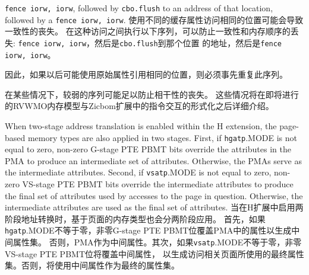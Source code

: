 {\tt fence iorw, iorw}, followed by {\tt cbo.flush} to an address of
that location, followed by a {\tt fence iorw, iorw}.
使用不同的缓存属性访问相同的位置可能会导致一致性的丧失。
在这种访问之间执行以下序列，可以防止一致性和内存顺序的丢失:
{\tt fence iorw, iorw}，然后是{\tt cbo.flush}到那个位置
的地址，然后是{\tt fence iorw, iorw}。

\begin{commentary}
因此，如果以后可能使用原始属性引用相同的位置，则必须事先重复此序列。
\end{commentary}

\begin{commentary}
在某些情况下，较弱的序列可能足以防止相干性的丧失。
这些情况将在即将进行的RVWMO内存模型与Zicbom扩展中的指令交互的形式化之后详细介绍。
\end{commentary}

When two-stage address translation is enabled within the H extension, the
page-based memory types are also applied in two stages.  First, if
{\tt hgatp}.MODE is not equal to zero, non-zero G-stage PTE PBMT bits override
the attributes in the PMA to produce an intermediate set of attributes.
Otherwise, the PMAs serve as the intermediate attributes.  Second, if
{\tt vsatp}.MODE is not equal to zero, non-zero VS-stage PTE PBMT bits override
the intermediate attributes to produce the final set of attributes used by
accesses to the page in question.  Otherwise, the intermediate attributes are
used as the final set of attributes.
当在H扩展中启用两阶段地址转换时，基于页面的内存类型也会分两阶段应用。
首先，如果{\tt hgatp}.MODE不等于零，非零G-stage PTE PBMT位覆盖PMA中的属性以生成中间属性集。
否则，PMA作为中间属性。其次，如果{\tt vsatp}.MODE不等于零，非零VS-stage PTE PBMT位将覆盖中间属性，
以生成访问相关页面所使用的最终属性集。否则，将使用中间属性作为最终的属性集。


